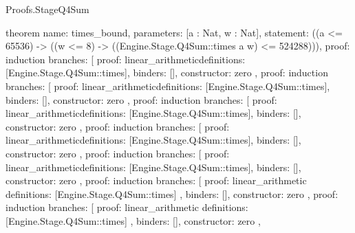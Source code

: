 \begin{lexlean}{Proofs.StageQ4Sum}
\begin{semanticmodule}
theorem{
  name: times_bound,
  parameters: [a : Nat, w : Nat],
  statement: ((a <= 65536) -> ((w <= 8) -> ((Engine.Stage.Q4Sum::times a w) <= 524288))),
  proof: induction{
    branches: [
      {
        proof: linear_arithmetic{definitions: [Engine.Stage.Q4Sum::times]},
        binders: [],
        constructor: zero
      },
      {
        proof: induction{
          branches: [
            {
              proof: linear_arithmetic{definitions: [Engine.Stage.Q4Sum::times]},
              binders: [],
              constructor: zero
            },
            {
              proof: induction{
                branches: [
                  {
                    proof: linear_arithmetic{definitions: [Engine.Stage.Q4Sum::times]},
                    binders: [],
                    constructor: zero
                  },
                  {
                    proof: induction{
                      branches: [
                        {
                          proof: linear_arithmetic{definitions: [Engine.Stage.Q4Sum::times]},
                          binders: [],
                          constructor: zero
                        },
                        {
                          proof: induction{
                            branches: [
                              {
                                proof: linear_arithmetic{definitions: [Engine.Stage.Q4Sum::times]},
                                binders: [],
                                constructor: zero
                              },
                              {
                                proof: induction{
                                  branches: [
                                    {
                                      proof: linear_arithmetic{
                                        definitions: [Engine.Stage.Q4Sum::times]
                                      },
                                      binders: [],
                                      constructor: zero
                                    },
                                    {
                                      proof: induction{
                                        branches: [
                                          {
                                            proof: linear_arithmetic{
                                              definitions: [Engine.Stage.Q4Sum::times]
                                            },
                                            binders: [],
                                            constructor: zero
                                          },
                                          {
}}}}}}}}}}}}}}}
\end{semanticmodule}
\end{lexlean}
